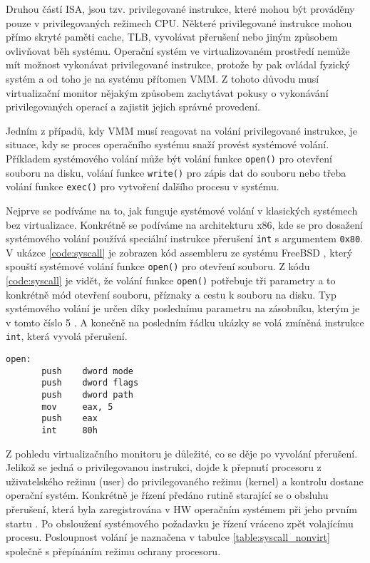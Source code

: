Druhou částí ISA, jsou tzv. privilegované instrukce, které mohou být prováděny pouze v privilegovaných režimech CPU. Některé privilegované instrukce mohou přímo skryté paměti cache, TLB, vyvolávat přerušení nebo
jiným způsobem ovlivňovat běh systému. Operační systém ve virtualizovaném prostředí nemůže mít možnost vykonávat privilegované instrukce, protože by pak ovládal fyzický systém a od toho je na systému přítomen VMM.
Z tohoto důvodu musí virtualizační monitor nějakým způsobem zachytávat pokusy o vykonávání privilegovaných operací a zajistit jejich správné provedení.

Jedním z případů, kdy VMM musí reagovat na volání privilegované instrukce, je situace, kdy se proces operačního systému snaží provést systémové volání. Příkladem systémového volání může být volání funkce \verb|open()| pro otevření
souboru na disku, volání funkce \verb|write()| pro zápis dat do souboru nebo třeba volání funkce \verb|exec()| pro vytvoření dalšího procesu v systému.

Nejprve se podíváme na to, jak funguje systémové volání v klasických systémech bez virtualizace. Konkrétně se podíváme na architekturu x86, kde se pro dosažení systémového volání používá speciální instrukce přerušení \verb|int| s argumentem 
\verb|0x80|. V ukázce \ref{code:syscall} je zobrazen kód assembleru ze systému FreeBSD \cite{freebsd_syscall}, který spouští systémové volání funkce \verb|open()| pro otevření souboru. Z kódu \ref{code:syscall} je vidět, že volání funkce \verb|open()|
potřebuje tři parametry a to konkrétně mód otevření souboru, příznaky a cestu k souboru na disku. Typ systémového volání je určen díky poslednímu parametru na zásobníku, kterým je v tomto číslo 5 \cite{vmm_book}. A konečně na posledním řádku ukázky se
volá zmíněná instrukce \verb|int|, která vyvolá přerušení.

\begin{lstlisting}[language={[x86masm]Assembler},caption={Systémové volání na FreeBSD},label={code:syscall}]
open:
       push    dword mode
       push    dword flags
       push    dword path
       mov     eax, 5
       push    eax
       int     80h
\end{lstlisting}

Z pohledu virtualizačního monitoru je důležité, co se děje po vyvolání přerušení. Jelikož se jedná o privilegovanou instrukci, dojde k přepnutí procesoru z uživatelského režimu (user) do privilegovaného režimu (kernel) a kontrolu dostane operační systém.
Konkrétně je řízení předáno rutině starající se o obsluhu přerušení, která byla zaregistrována v HW operačním systémem při jeho prvním startu \cite{vmm_book}. Po obsloužení systémového požadavku je řízení vráceno zpět volajícímu procesu.
Posloupnost volání je naznačena v tabulce \ref{table:syscall_nonvirt} společně s přepínáním režimu ochrany procesoru.

